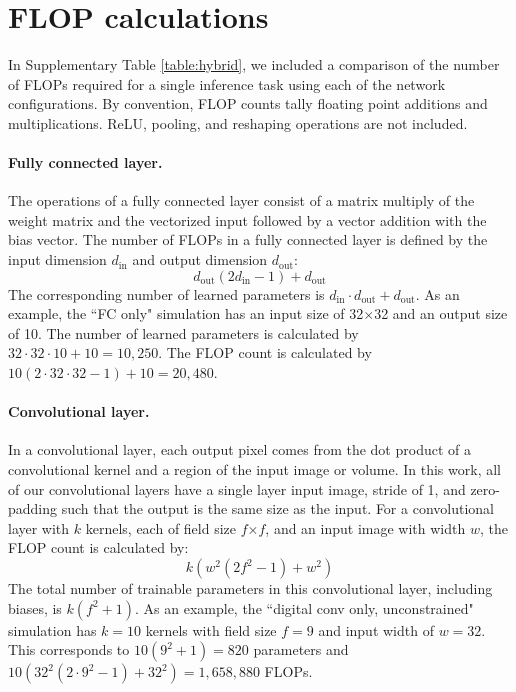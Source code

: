 \documentclass[fleqn,10pt]{wlscirepsupp}
\begin{document}
\setlength{\tabcolsep}{1.4pt}


\section{FLOP calculations}

In Supplementary Table \ref{table:hybrid}, we included a comparison of the number of FLOPs required for a single inference task using each of the network configurations. By convention, FLOP counts tally floating point additions and multiplications. ReLU, pooling, and reshaping operations are not included.

\paragraph{Fully connected layer.} The operations of a fully connected layer consist of a matrix multiply of the weight matrix and the vectorized input followed by a vector addition with the bias vector. The number of FLOPs in a fully connected layer is defined by the input dimension $d_\text{in}$ and output dimension $d_\text{out}$:
\begin{equation}
d_\text{out}(2 d_\text{in} -1) + d_\text{out}
\end{equation}
The corresponding number of learned parameters is $d_\text{in}\cdot d_\text{out} + d_\text{out}$. As an example, the ``FC only" simulation has an input size of 32$\times$32 and an output size of 10. The number of learned parameters is calculated by $32\cdot 32 \cdot 10 + 10 = 10,250$. The FLOP count is calculated by $10(2\cdot 32\cdot 32 - 1) + 10 = 20,480$. 

\paragraph{Convolutional layer.} In a convolutional layer, each output pixel comes from the dot product of a convolutional kernel and a region of the input image or volume. In this work, all of our convolutional layers have a single layer input image, stride of 1, and zero-padding such that the output is the same size as the input. For a convolutional layer with $k$ kernels, each of field size $f$$\times$$f$, and an input image with width $w$, the FLOP count is calculated by: 
\begin{equation}
k(w^2 (2f^2 - 1) + w^2)
\end{equation}
The total number of trainable parameters in this convolutional layer, including biases, is $k(f^2 + 1)$. As an example, the ``digital conv only, unconstrained" simulation has $k = 10$ kernels with field size $f = 9$ and input width of $w = 32$. This corresponds to $10(9^2 + 1) = 820$ parameters and $10(32^2(2\cdot 9^2 - 1) + 32^2) = 1,658,880$ FLOPs.
\end{document}
